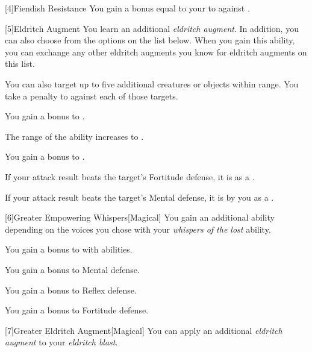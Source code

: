         [4]{Fiendish Resistance} You gain a bonus equal to your  to  against .

        [5]{Eldritch Augment} You learn an additional \textit{eldritch augment}.
        In addition, you can also choose from the options on the list below.
        When you gain this ability, you can exchange any other eldritch augments you know for eldritch augments on this list.
        {
             You can also target up to five additional creatures or objects within range.
            You take a  penalty to  against each of those targets.

             You gain a  bonus to .

             The range of the ability increases to \rnglong.

             You gain a  bonus to .

             If your attack result beats the target's Fortitude defense, it is  as a .

             If your attack result beats the target's Mental defense, it is  by you as a .
        }

        [6]{Greater Empowering Whispers}[Magical] You gain an additional ability depending on the voices you chose with your \textit{whispers of the lost} ability.
        {
             You gain a  bonus to  with  abilities.

             You gain a  bonus to Mental defense.

             You gain a  bonus to Reflex defense.

             You gain a  bonus to Fortitude defense.
        }

        [7]{Greater Eldritch Augment}[Magical] You can apply an additional \textit{eldritch augment} to your \textit{eldritch blast}.
